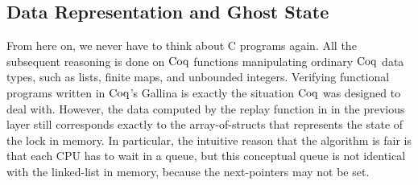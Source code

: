 \subsection{Data Representation and Ghost State}
\label{chapter:mcslock:sec:representation-ghost}

From here on, we never have to think about C programs again.  All the
subsequent reasoning is done on $\mathrm{Coq}$ functions manipulating ordinary
$\mathrm{Coq}$ data types, such as lists, finite maps, and unbounded integers.
Verifying functional programs written in $\mathrm{Coq}$'s Gallina is exactly the
situation $\mathrm{Coq}$ was designed to deal with. However, the data computed
by the replay function in in the previous layer still corresponds
exactly to the array-of-structs that represents the state of the lock
in memory.
In particular, the intuitive reason that the algorithm is fair is that
each CPU has to wait in a queue, but this conceptual queue is not identical with
the linked-list in memory, because the next-pointers may not be set.

